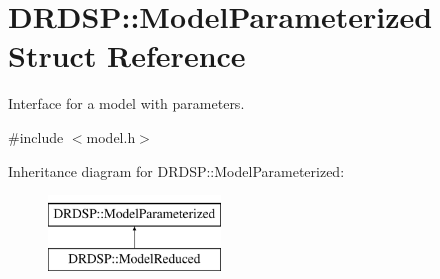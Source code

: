 \hypertarget{struct_d_r_d_s_p_1_1_model_parameterized}{\section{D\-R\-D\-S\-P\-:\-:Model\-Parameterized Struct Reference}
\label{struct_d_r_d_s_p_1_1_model_parameterized}
}


Interface for a model with parameters.  




{\ttfamily \#include $<$model.\-h$>$}

Inheritance diagram for D\-R\-D\-S\-P\-:\-:Model\-Parameterized\-:\begin{figure}[H]
\begin{center}
\leavevmode
\includegraphics[height=2.000000cm]{struct_d_r_d_s_p_1_1_model_parameterized}
\end{center}
\end{figure}
